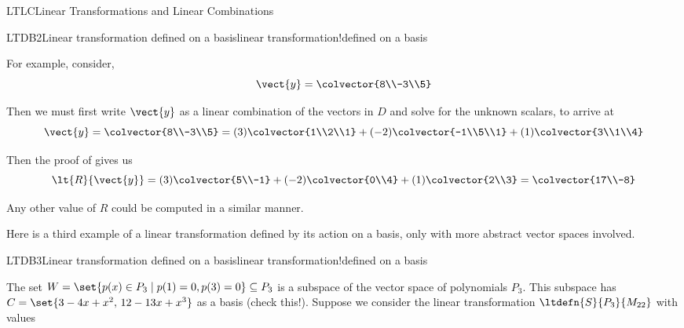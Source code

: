 \begin{subsect}{LTLC}{Linear Transformations and Linear Combinations}
\begin{example}{LTDB2}{Linear transformation defined on a basis}{linear transformation!defined on a basis}
%
\begin{para}For example, consider,
%
\begin{equation*}
\vect{y}=\colvector{8\\-3\\5}
\end{equation*}
\end{para}
%
\begin{para}Then we must first write $\vect{y}$ as a linear combination of the vectors in $D$ and solve for the unknown scalars, to arrive at
%
\begin{equation*}
\vect{y}=\colvector{8\\-3\\5}= (3)\colvector{1\\2\\1}+ (-2)\colvector{-1\\5\\1}+ (1)\colvector{3\\1\\4}
\end{equation*}
\end{para}
%
\begin{para}Then the proof of  gives us
%
\begin{equation*}
\lt{R}{\vect{y}}=(3)\colvector{5\\-1}+ (-2)\colvector{0\\4}+ (1)\colvector{2\\3}= \colvector{17\\-8}
\end{equation*}
\end{para}
%
\begin{para}Any other value of $R$ could be computed in a similar manner.\end{para}
%
\end{example}
%
\begin{para}Here is a third example of a linear transformation defined by its action on a basis, only with more abstract vector spaces involved.\end{para}
%
\begin{example}{LTDB3}{Linear transformation defined on a basis}{linear transformation!defined on a basis}
\begin{para}The set $W=\set{p(x)\in P_3\mid p(1)=0, p(3)=0}\subseteq P_3$ is a subspace of the vector space of polynomials $P_3$.  This subspace has $C=\set{3-4x+x^2,\,12-13x+x^3}$ as a basis (check this!).  Suppose we consider the linear transformation $\ltdefn{S}{P_3}{M_{22}}$ with values

\end{para}
\end{example}
\end{subsect}
